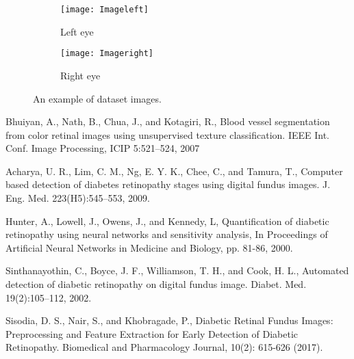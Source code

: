 \documentclass[letterpaper,11pt]{article}
\begin{document}
\begin{figure*}[t!]
    \centering
    \begin{subfigure}[b]{0.4\textwidth}
        \centering
        \texttt{[image: Imageleft]}
        \caption{Left eye}
    \end{subfigure}%
    \begin{subfigure}[b]{0.44\textwidth}
        \centering
        \texttt{[image: Imageright]}
        \caption{Right eye}
    \end{subfigure}
    \caption{An example of dataset images.}
    \label{fig1}
\end{figure*}









\begin{thebibliography}{99}

 Bhuiyan, A., Nath, B., Chua, J., and Kotagiri, R., Blood vessel segmentation from color retinal images using unsupervised texture classification. IEEE Int. Conf. Image Processing, ICIP 5:521–524,
2007

Acharya, U. R., Lim, C. M., Ng, E. Y. K., Chee, C., and Tamura, T., Computer based detection of diabetes retinopathy stages using digital fundus images. J. Eng. Med. 223(H5):545–553, 2009.

Hunter, A., Lowell, J., Owens, J., and Kennedy, L, Quantification of diabetic retinopathy using neural networks and sensitivity analysis, In Proceedings of Artificial Neural Networks in Medicine and Biology, pp. 81-86, 2000.

Sinthanayothin, C., Boyce, J. F., Williamson, T. H., and Cook, H. L., Automated detection of diabetic retinopathy on digital fundus image. Diabet. Med. 19(2):105–112, 2002.

Sisodia, D. S., Nair, S., and Khobragade, P., Diabetic Retinal Fundus Images: Preprocessing and Feature Extraction for Early Detection of Diabetic Retinopathy. Biomedical and Pharmacology Journal, 10(2): 615-626 (2017).

\end{thebibliography}
\end{document}
